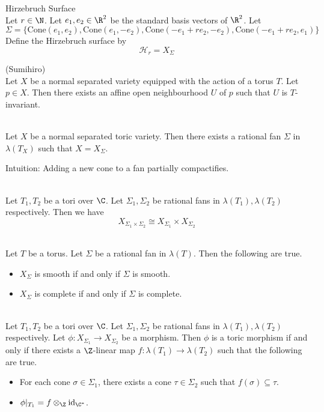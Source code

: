 \documentclass[a4paper]{article}
\begin{document}
\begin{eg}{Hirzebruch Surface}{}\\
Let $r\in\N$. Let $e_1,e_2\in\R^2$ be the standard basis vectors of $\R^2$. Let $$\Sigma=\{\text{Cone}(e_1,e_2),\text{Cone}(e_1,-e_2),\text{Cone}(-e_1+re_2,-e_2),\text{Cone}(-e_1+re_2,e_1)\}$$ Define the Hirzebruch surface by $$\mathscr{H}_r=X_\Sigma$$
\end{eg}

\begin{thm}{(Sumihiro)}{}\\
Let $X$ be a normal separated variety equipped with the action of a torus $T$. Let $p\in X$. Then there exists an affine open neighbourhood $U$ of $p$ such that $U$ is $T$-invariant. 
\end{thm}

\begin{crl}{}{}\\
Let $X$ be a normal separated toric variety. Then there exists a rational fan $\Sigma$ in $\lambda(T_X)$ such that $X=X_\Sigma$. 
\end{crl}

Intuition: Adding a new cone to a fan partially compactifies. 

\begin{prp}{}{}\\
Let $T_1,T_2$ be a tori over $\C$. Let $\Sigma_1,\Sigma_2$ be rational fans in $\lambda(T_1),\lambda(T_2)$ respectively. Then we have $$X_{\Sigma_1\times\Sigma_2}\cong X_{\Sigma_1}\times X_{\Sigma_2}$$
\end{prp}

\begin{prp}{}{}\\
Let $T$ be a torus. Let $\Sigma$ be a rational fan in $\lambda(T)$. Then the following are true. 
\begin{itemize}
\item $X_\Sigma$ is smooth if and only if $\Sigma$ is smooth. 
\item $X_\Sigma$ is complete if and only if $\Sigma$ is complete. 
\end{itemize}
\end{prp}

\begin{prp}{}{}\\
Let $T_1,T_2$ be a tori over $\C$. Let $\Sigma_1,\Sigma_2$ be rational fans in $\lambda(T_1),\lambda(T_2)$ respectively. Let $\phi:X_{\Sigma_1}\to X_{\Sigma_2}$ be a morphism. Then $\phi$ is a toric morphism if and only if there exists a $\Z$-linear map $f:\lambda(T_1)\to\lambda(T_2)$ such that the following are true. 
\begin{itemize}
\item For each cone $\sigma\in\Sigma_1$, there exists a cone $\tau\in\Sigma_2$ such that $f(\sigma)\subseteq\tau$. 
\item $\phi|_{T_1}=f\otimes_\Z\text{id}_{\C^\ast}$. 
\end{itemize}
\end{prp}
\end{document}

